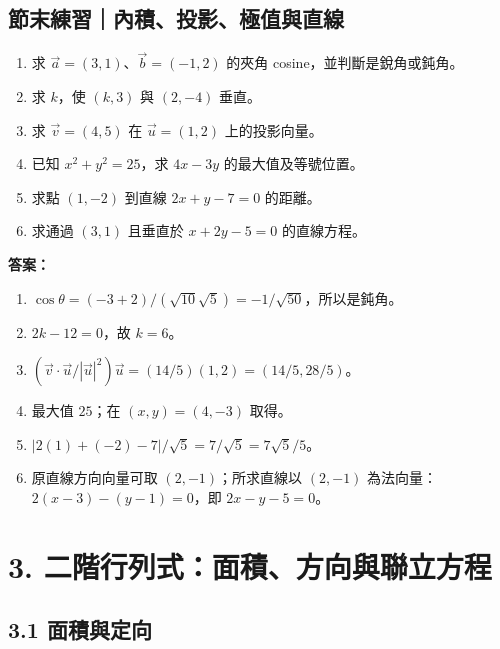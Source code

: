 \documentclass[11pt,a4paper]{article}
\providecommand{\tightlist}{%
  \setlength{\itemsep}{0pt}\setlength{\parskip}{0pt}}
\begin{document}
\begin{HandoutSelfCheck}

\subsection{節末練習｜內積、投影、極值與直線}\label{ux7bc0ux672bux7df4ux7fd2ux5167ux7a4dux6295ux5f71ux6975ux503cux8207ux76f4ux7dda}

\begin{enumerate}
\def\labelenumi{\arabic{enumi}.}
\tightlist
\item
  求 \(\vec a=(3,1)\)、\(\vec b=(-1,2)\) 的夾角 cosine，並判斷是銳角或鈍角。
\item
  求 \(k\)，使 \((k,3)\) 與 \((2,-4)\) 垂直。
\item
  求 \(\vec v=(4,5)\) 在 \(\vec u=(1,2)\) 上的投影向量。
\item
  已知 \(x^2+y^2=25\)，求 \(4x-3y\) 的最大值及等號位置。
\item
  求點 \((1,-2)\) 到直線 \(2x+y-7=0\) 的距離。
\item
  求通過 \((3,1)\) 且垂直於 \(x+2y-5=0\) 的直線方程。
\end{enumerate}

\textbf{答案：}

\begin{enumerate}
\def\labelenumi{\arabic{enumi}.}
\tightlist
\item
  \(\cos\theta=(-3+2)/(\sqrt{10}\sqrt5)=-1/\sqrt{50}\)，所以是鈍角。
\item
  \(2k-12=0\)，故 \(k=6\)。
\item
  \((\vec v\cdot\vec u/|\vec u|^2)\vec u=(14/5)(1,2)=(14/5,28/5)\)。
\item
  最大值 \(25\)；在 \((x,y)=(4,-3)\) 取得。
\item
  \(|2(1)+(-2)-7|/\sqrt5=7/\sqrt5=7\sqrt5/5\)。
\item
  原直線方向向量可取 \((2,-1)\)；所求直線以 \((2,-1)\) 為法向量：\(2(x-3)-(y-1)=0\)，即 \(2x-y-5=0\)。
\end{enumerate}

\end{HandoutSelfCheck}

\section{3. 二階行列式：面積、方向與聯立方程}\label{ux4e8cux968eux884cux5217ux5f0fux9762ux7a4dux65b9ux5411ux8207ux806fux7acbux65b9ux7a0b}

\subsection{3.1 面積與定向}\label{ux9762ux7a4dux8207ux5b9aux5411}
\end{document}
